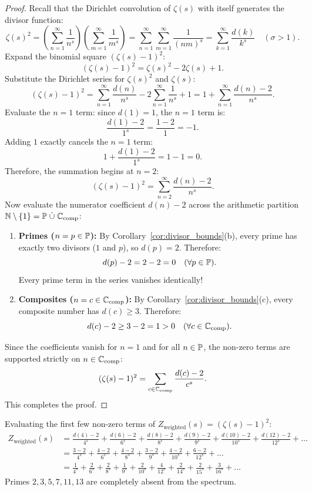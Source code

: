 \begin{proof}
\leanok
Recall that the Dirichlet convolution of $\zeta(s)$ with itself generates the divisor function:
$$\zeta(s)^2 = \left( \sum_{n=1}^\infty \frac{1}{n^s} \right)\left( \sum_{m=1}^\infty \frac{1}{m^s} \right) = \sum_{n=1}^\infty \sum_{m=1}^\infty \frac{1}{(n m)^s} = \sum_{k=1}^\infty \frac{d(k)}{k^s} \quad (\sigma > 1).$$
Expand the binomial square $(\zeta(s) - 1)^2$:
$$(\zeta(s) - 1)^2 = \zeta(s)^2 - 2 \zeta(s) + 1.$$
Substitute the Dirichlet series for $\zeta(s)^2$ and $\zeta(s)$:
$$(\zeta(s) - 1)^2 = \sum_{n=1}^\infty \frac{d(n)}{n^s} - 2 \sum_{n=1}^\infty \frac{1}{n^s} + 1 = 1 + \sum_{n=1}^\infty \frac{d(n) - 2}{n^s}.$$
Evaluate the $n = 1$ term: since $d(1) = 1$, the $n = 1$ term is:
$$\frac{d(1) - 2}{1^s} = \frac{1 - 2}{1} = -1.$$
Adding $1$ exactly cancels the $n = 1$ term:
$$1 + \frac{d(1) - 2}{1^s} = 1 - 1 = 0.$$
Therefore, the summation begins at $n = 2$:
$$(\zeta(s) - 1)^2 = \sum_{n=2}^\infty \frac{d(n) - 2}{n^s}.$$
Now evaluate the numerator coefficient $d(n) - 2$ across the arithmetic partition $\mathbb{N} \setminus \{1\} = \mathbb{P} \;\dot{\cup}\; \mathbb{C}_{\mathrm{comp}}$:
\begin{enumerate}
  \item \textbf{Primes ($n = p \in \mathbb{P}$):} By Corollary~\ref{cor:divisor_bounds}(b), every prime has exactly two divisors ($1$ and $p$), so $d(p) = 2$. Therefore:
  $$d(p) - 2 = 2 - 2 = 0 \quad (\forall p \in \mathbb{P}).$$
  Every prime term in the series vanishes identically!
  \item \textbf{Composites ($n = c \in \mathbb{C}_{\mathrm{comp}}$):} By Corollary~\ref{cor:divisor_bounds}(c), every composite number has $d(c) \ge 3$. Therefore:
  $$d(c) - 2 \ge 3 - 2 = 1 > 0 \quad (\forall c \in \mathbb{C}_{\mathrm{comp}}).$$
\end{enumerate}
Since the coefficients vanish for $n = 1$ and for all $n \in \mathbb{P}$, the non-zero terms are supported strictly on $n \in \mathbb{C}_{\mathrm{comp}}$:
$$(\zeta(s) - 1)^2 = \sum_{c \in \mathbb{C}_{\mathrm{comp}}} \frac{d(c) - 2}{c^s}.$$
This completes the proof.
\end{proof}

\begin{example}
Evaluating the first few non-zero terms of $Z_{\mathrm{weighted}}(s) = (\zeta(s)-1)^2$:
\begin{align*}
Z_{\mathrm{weighted}}(s) &= \frac{d(4)-2}{4^s} + \frac{d(6)-2}{6^s} + \frac{d(8)-2}{8^s} + \frac{d(9)-2}{9^s} + \frac{d(10)-2}{10^s} + \frac{d(12)-2}{12^s} + \dots \\
&= \frac{3-2}{4^s} + \frac{4-2}{6^s} + \frac{4-2}{8^s} + \frac{3-2}{9^s} + \frac{4-2}{10^s} + \frac{6-2}{12^s} + \dots \\
&= \frac{1}{4^s} + \frac{2}{6^s} + \frac{2}{8^s} + \frac{1}{9^s} + \frac{2}{10^s} + \frac{4}{12^s} + \frac{2}{14^s} + \frac{2}{15^s} + \frac{3}{16^s} + \dots
\end{align*}
Primes $2, 3, 5, 7, 11, 13$ are completely absent from the spectrum.
\end{example}

